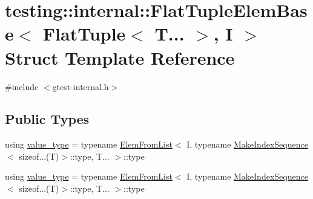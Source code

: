 \hypertarget{structtesting_1_1internal_1_1_flat_tuple_elem_base_3_01_flat_tuple_3_01_t_8_8_8_01_4_00_01_i_01_4}{}\section{testing\+::internal\+::Flat\+Tuple\+Elem\+Base$<$ Flat\+Tuple$<$ T... $>$, I $>$ Struct Template Reference}
\label{structtesting_1_1internal_1_1_flat_tuple_elem_base_3_01_flat_tuple_3_01_t_8_8_8_01_4_00_01_i_01_4}


{\ttfamily \#include $<$gtest-\/internal.\+h$>$}

\subsection*{Public Types}
\begin{DoxyCompactItemize}
\item 
using \mbox{\hyperlink{structtesting_1_1internal_1_1_flat_tuple_elem_base_3_01_flat_tuple_3_01_t_8_8_8_01_4_00_01_i_01_4_a6b87a445f87724f9363b348e6c697766}{value\+\_\+type}} = typename \mbox{\hyperlink{structtesting_1_1internal_1_1_elem_from_list}{Elem\+From\+List}}$<$ I, typename \mbox{\hyperlink{structtesting_1_1internal_1_1_make_index_sequence}{Make\+Index\+Sequence}}$<$ sizeof...(T)$>$\+::type, T... $>$\+::type
\item 
using \mbox{\hyperlink{structtesting_1_1internal_1_1_flat_tuple_elem_base_3_01_flat_tuple_3_01_t_8_8_8_01_4_00_01_i_01_4_a6b87a445f87724f9363b348e6c697766}{value\+\_\+type}} = typename \mbox{\hyperlink{structtesting_1_1internal_1_1_elem_from_list}{Elem\+From\+List}}$<$ I, typename \mbox{\hyperlink{structtesting_1_1internal_1_1_make_index_sequence}{Make\+Index\+Sequence}}$<$ sizeof...(T)$>$\+::type, T... $>$\+::type
\end{DoxyCompactItemize}
